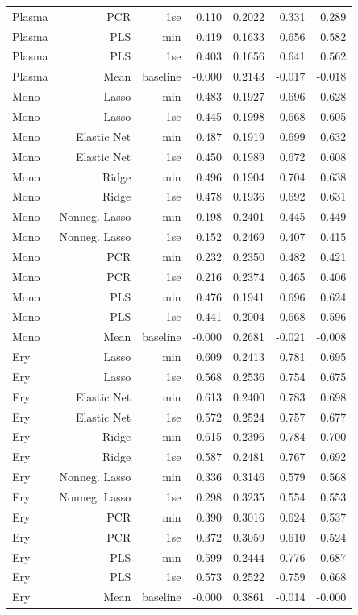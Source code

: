 {\begin{longtable}{lrrrrrr}
Plasma & PCR & 1se & 0.110 & 0.2022 & 0.331 & 0.289\\
Plasma & PLS & min & 0.419 & 0.1633 & 0.656 & 0.582\\
Plasma & PLS & 1se & 0.403 & 0.1656 & 0.641 & 0.562\\
Plasma & Mean & baseline & -0.000 & 0.2143 & -0.017 & -0.018\\
Mono & Lasso & min & 0.483 & 0.1927 & 0.696 & 0.628\\
Mono & Lasso & 1se & 0.445 & 0.1998 & 0.668 & 0.605\\
Mono & Elastic Net & min & 0.487 & 0.1919 & 0.699 & 0.632\\
Mono & Elastic Net & 1se & 0.450 & 0.1989 & 0.672 & 0.608\\
Mono & Ridge & min & 0.496 & 0.1904 & 0.704 & 0.638\\
Mono & Ridge & 1se & 0.478 & 0.1936 & 0.692 & 0.631\\
Mono & Nonneg. Lasso & min & 0.198 & 0.2401 & 0.445 & 0.449\\
Mono & Nonneg. Lasso & 1se & 0.152 & 0.2469 & 0.407 & 0.415\\
Mono & PCR & min & 0.232 & 0.2350 & 0.482 & 0.421\\
Mono & PCR & 1se & 0.216 & 0.2374 & 0.465 & 0.406\\
Mono & PLS & min & 0.476 & 0.1941 & 0.696 & 0.624\\
Mono & PLS & 1se & 0.441 & 0.2004 & 0.668 & 0.596\\
Mono & Mean & baseline & -0.000 & 0.2681 & -0.021 & -0.008\\
Ery & Lasso & min & 0.609 & 0.2413 & 0.781 & 0.695\\
Ery & Lasso & 1se & 0.568 & 0.2536 & 0.754 & 0.675\\
Ery & Elastic Net & min & 0.613 & 0.2400 & 0.783 & 0.698\\
Ery & Elastic Net & 1se & 0.572 & 0.2524 & 0.757 & 0.677\\
Ery & Ridge & min & 0.615 & 0.2396 & 0.784 & 0.700\\
Ery & Ridge & 1se & 0.587 & 0.2481 & 0.767 & 0.692\\
Ery & Nonneg. Lasso & min & 0.336 & 0.3146 & 0.579 & 0.568\\
Ery & Nonneg. Lasso & 1se & 0.298 & 0.3235 & 0.554 & 0.553\\
Ery & PCR & min & 0.390 & 0.3016 & 0.624 & 0.537\\
Ery & PCR & 1se & 0.372 & 0.3059 & 0.610 & 0.524\\
Ery & PLS & min & 0.599 & 0.2444 & 0.776 & 0.687\\
Ery & PLS & 1se & 0.573 & 0.2522 & 0.759 & 0.668\\
Ery & Mean & baseline & -0.000 & 0.3861 & -0.014 & -0.000\\
\bottomrule\end{longtable}}

